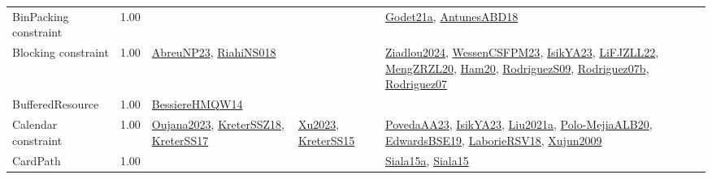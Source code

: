{\begin{longtable}{p{3cm}r>{\raggedright\arraybackslash}p{6cm}>{\raggedright\arraybackslash}p{6cm}>{\raggedright\arraybackslash}p{8cm}}
\index{BinPacking constraint}\index{Constraints!BinPacking constraint}BinPacking constraint &  1.00 &  &  & \hyperref[detail:Godet21a]{Godet21a}, \hyperref[detail:AntunesABD18]{AntunesABD18}\\
\index{Blocking constraint}\index{Constraints!Blocking constraint}Blocking constraint &  1.00 & \hyperref[detail:AbreuNP23]{AbreuNP23}, \hyperref[detail:RiahiNS018]{RiahiNS018} &  & \hyperref[detail:Ziadlou2024]{Ziadlou2024}, \hyperref[detail:WessenCSFPM23]{WessenCSFPM23}, \hyperref[detail:IsikYA23]{IsikYA23}, \hyperref[detail:LiFJZLL22]{LiFJZLL22}, \hyperref[detail:MengZRZL20]{MengZRZL20}, \hyperref[detail:Ham20]{Ham20}, \hyperref[detail:RodriguezS09]{RodriguezS09}, \hyperref[detail:Rodriguez07b]{Rodriguez07b}, \hyperref[detail:Rodriguez07]{Rodriguez07}\\
\index{BufferedResource}\index{Constraints!BufferedResource}BufferedResource &  1.00 & \hyperref[detail:BessiereHMQW14]{BessiereHMQW14} &  & \\
\index{Calendar constraint}\index{Constraints!Calendar constraint}Calendar constraint &  1.00 & \hyperref[detail:Oujana2023]{Oujana2023}, \hyperref[detail:KreterSSZ18]{KreterSSZ18}, \hyperref[detail:KreterSS17]{KreterSS17} & \hyperref[detail:Xu2023]{Xu2023}, \hyperref[detail:KreterSS15]{KreterSS15} & \hyperref[detail:PovedaAA23]{PovedaAA23}, \hyperref[detail:IsikYA23]{IsikYA23}, \hyperref[detail:Liu2021a]{Liu2021a}, \hyperref[detail:Polo-MejiaALB20]{Polo-MejiaALB20}, \hyperref[detail:EdwardsBSE19]{EdwardsBSE19}, \hyperref[detail:LaborieRSV18]{LaborieRSV18}, \hyperref[detail:Xujun2009]{Xujun2009}\\
\index{CardPath}\index{Constraints!CardPath}CardPath &  1.00 &  &  & \hyperref[detail:Siala15a]{Siala15a}, \hyperref[detail:Siala15]{Siala15}\\

\end{longtable}}
